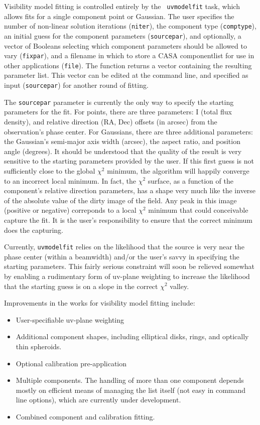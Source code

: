 Visibility model fitting is controlled entirely by the {\tt
uvmodelfit} task, which allows fits for a single component point or
Gaussian.  The user specifies the number of non-linear solution
iterations ({\tt niter}), the component type ({\tt comptype}), an
initial guess for the component parameters ({\tt sourcepar}), and
optionally, a vector of Booleans selecting which component parameters
should be allowed to vary ({\tt fixpar}), and a filename in which to
store a CASA componentlist for use in other applications ({\tt file}).
The function returns a vector containing the resulting parameter list.
This vector can be edited at the command line, and specified as input
({\tt sourcepar}) for another round of fitting.

The {\tt sourcepar} parameter is currently the only way to specify the
starting parameters for the fit.  For points, there are three
parameters: I (total flux density), and relative direction (RA, Dec)
offsets (in arcsec) from the observation's phase center.  For
Gaussians, there are three additional parameters: the Gaussian's
semi-major axis width (arcsec), the aspect ratio, and position angle
(degrees).  It should be understood that the quality of the result is
very sensitive to the starting parameters provided by the user.  If
this first guess is not sufficiently close to the global $\chi^2$
minimum, the algorithm will happily converge to an incorrect local
minimum.  In fact, the $\chi^2$ surface, as a function of the
component's relative direction parameters, has a shape very much like
the inverse of the absolute value of the dirty image of the field.
Any peak in this image (positive or negative) correponds to a local
$\chi^2$ minimum that could conceivable capture the fit.  It is the
user's responsibility to ensure that the correct minimum does the
capturing.

Currently, {\tt uvmodelfit} relies on the likelihood that the source
is very near the phase center (within a beamwidth) and/or the user's
savvy in specifying the starting parameters.  This fairly serious
constraint will soon be relieved somewhat by enabling a rudimentary
form of uv-plane weighting to increase the likelihood that the
starting guess is on a slope in the correct $\chi^2$ valley.

Improvements in the works for visibility model fitting include:

\begin{itemize}
   \item User-specifiable uv-plane weighting
   \item Additional component shapes, including elliptical disks, rings,
         and optically thin spheroids.
   \item Optional calibration pre-application
   \item Multiple components.  The handling of more than one component
         depends mostly on efficient means of managing the list itself (not easy in
         command line options), which are currently under development.
   \item Combined component and calibration fitting.
\end{itemize}

